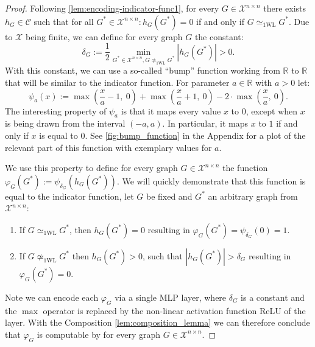 \documentclass[11pt, dvipsnames, DIV=12]{scrreprt}
\theoremstyle{definition}
\newtheorem{lemma}[theorem]{Lemma}
\newcommand{\cC}{\mathcal{C}}
\newcommand{\cX}{\mathcal{X}}
\newcommand{\Rb}{\mathbb{R}}
\newcommand{\wlnn}{\text{1-WL+NN}}
\newcommand{\wliso}{\simeq_{\text{1WL}}}
\newcommand{\xnn}{\mathcal{X}^{n \times n}}
\begin{document}
\begin{proof}
    Following \cref{lem:encoding-indicator-func1}, for every $G\in \xnn$ there exists $h_G \in \cC$ such that for all $G^* \in \xnn: h_G(G^*) = 0$ if and only if $G \wliso G^*$. Due to $\cX$ being finite, we can define for every graph $G$ the constant:
    \begin{equation*}
        \delta_G := \frac{1}{2} \min_{G^* \in \xnn , G \not\wliso G^*} |h_G(G^*)| > 0.
    \end{equation*}
    With this constant, we can use a so-called ``bump'' function working from $\Rb$ to $\Rb$ that will be similar to the indicator function. For parameter $a \in \Rb$ with $a > 0$ let:
    \begin{equation*}
        \psi_a(x) := \max(\frac{x}{a} -1,\ 0) + \max(\frac{x}{a}+1, \ 0) - 2 \cdot \max(\frac{x}{a}, \ 0).
    \end{equation*}
    The interesting property of $\psi_a$ is that it maps every value $x$ to $0$, except when $x$ is being drawn from the interval $(-a, a)$. In particular, it maps $x$ to $1$ if and only if $x$ is equal to $0$. See \autoref{fig:bump_function} in the Appendix for a plot of the relevant part of this function with exemplary values for $a$.
    
    We use this property to define for every graph $G \in \xnn$ the function $\varphi_G(G^*) := \psi_{\delta_G} (h_G(G^*))$. 
    We will quickly demonstrate that this function is equal to the indicator function, let $G$ be fixed and $G^*$ an arbitrary graph from $\xnn$:
    \begin{enumerate}
        \item If $G \wliso G^*$, then $h_G(G^*) = 0$ resulting in $\varphi_G(G^*) = \psi_{\delta_G}(0) = 1$.
        \item If $G \not\wliso G^*$ then $h_G(G^*) > 0$, such that $|h_G(G^*)|> \delta_G$ resulting in $\varphi_G(G^*) = 0$.
    \end{enumerate}
    Note we can encode each $\varphi_G$ via a single MLP layer, where $\delta_G$ is a constant and the $\max$ operator is replaced by the non-linear activation function ReLU of the layer. With the Composition \cref{lem:composition_lemma} we can therefore conclude that $\varphi_G$ is computable by \wlnn for every graph $G \in \xnn$.
\end{proof}
\end{document}
